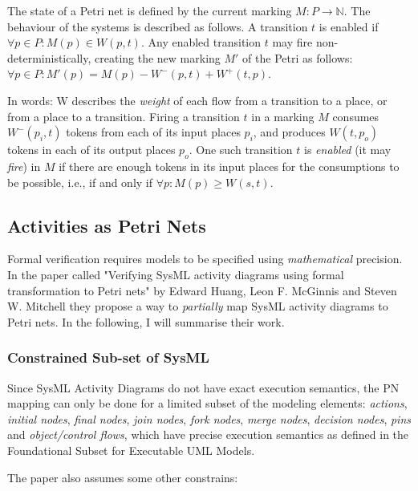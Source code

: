 The state of a Petri net is defined by the current marking \( M : P \rightarrow \mathbb{N} \). The behaviour of the systems is described as follows. A transition \( t \) is enabled if \( \forall p \in P : M(p) \in W(p, t) \). Any enabled transition \(t\) may fire non-deterministically, creating the new marking \( M' \) of the Petri as follows: \( \forall p \in P : M'(p) = M(p) - W^-(p, t) + W^+(t, p) \).

In words: W describes the \emph{weight} of each flow from a transition to a place, or from a place to a transition. Firing a transition \(t\) in a marking \(M\) consumes \(W^-(p_i, t)\) tokens from each of its input places \(p_i\), and produces \(W(t, p_o)\) tokens in each of its output places \(p_o\). One such transition \(t\) is \emph{enabled} (it may \emph{fire}) in \(M\) if there are enough tokens in its input places for the consumptions to be possible, i.e., if and only if \( \forall p : M(p) \ge W(s, t)\).

\subsection{Activities as Petri Nets}\label{ssec:activities-as-petri-nets}

Formal verification requires models to be specified using \emph{mathematical} precision. In the paper called "Verifying SysML activity diagrams using formal transformation to Petri nets"\cite{https://doi.org/10.1002/sys.21524} by Edward Huang, Leon F. McGinnis and Steven W. Mitchell they propose a way to \emph{partially} map SysML activity diagrams to Petri nets. In the following, I will summarise their work.

\subsubsection{Constrained Sub-set of SysML}\label{ssec:sysml_assumptions}

Since SysML Activity Diagrams do not have exact execution semantics\cite{euml}, the PN mapping can only be done for a limited subset of the modeling elements: \emph{actions}, \emph{initial nodes}, \emph{final nodes}, \emph{join nodes}, \emph{fork nodes}, \emph{merge nodes}, \emph{decision nodes}, \emph{pins} and \emph{object/control flows}, which have precise execution semantics as defined in the Foundational Subset for Executable UML Models.\cite{fuml}

The paper also assumes some other constrains:

